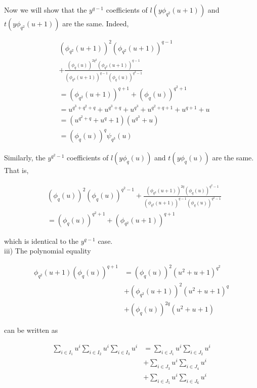 \documentclass[10pt]{article}
\begin{document}
Now we will show that the $y^{q-1}$ coefficients of $l\left(y \phi_{q^{2}}(u+1)\right)$ and $t\left(y \phi_{q^{2}}(u+1)\right)$ are the same. Indeed,

$$
\begin{aligned}
& \left(\phi_{q^{2}}(u+1)\right)^{2}\left(\phi_{q^{2}}(u+1)\right)^{q-1} \\
& +\frac{\left(\phi_{q}(u)\right)^{2 q^{2}}\left(\phi_{q^{2}}(u+1)\right)^{q-1}}{\left(\phi_{q^{2}}(u+1)\right)^{q-1}\left(\phi_{q}(u)\right)^{q^{2}-1}} \\
& =\left(\phi_{q^{2}}(u+1)\right)^{q+1}+\left(\phi_{q}(u)\right)^{q^{2}+1} \\
& =u^{q^{3}+q^{2}+q}+u^{q^{3}+q}+u^{q^{3}}+u^{q^{2}+q+1}+u^{q+1}+u \\
& =\left(u^{q^{2}+q}+u^{q}+1\right)\left(u^{q^{3}}+u\right) \\
& =\left(\phi_{q}(u)\right)^{q} \psi_{q^{3}}(u)
\end{aligned}
$$

Similarly, the $y^{q^{2}-1}$ coefficients of $l\left(y \phi_{q}(u)\right)$ and $t\left(y \phi_{q}(u)\right)$ are the same. That is,

$$
\begin{aligned}
& \left(\phi_{q}(u)\right)^{2}\left(\phi_{q}(u)\right)^{q^{2}-1}+\frac{\left(\phi_{q^{2}}(u+1)\right)^{2 q}\left(\phi_{q}(u)\right)^{q^{2}-1}}{\left(\phi_{q^{2}}(u+1)\right)^{q-1}\left(\phi_{q}(u)\right)^{q^{2}-1}} \\
& =\left(\phi_{q}(u)\right)^{q^{2}+1}+\left(\phi_{q^{2}}(u+1)\right)^{q+1}
\end{aligned}
$$

which is identical to the $y^{q-1}$ case.\\
iii) The polynomial equality

$$
\begin{aligned}
\phi_{q^{2}}(u+1)\left(\phi_{q}(u)\right)^{q+1} & =\left(\phi_{q}(u)\right)^{2}\left(u^{2}+u+1\right)^{q^{2}} \\
& +\left(\phi_{q^{2}}(u+1)\right)^{2}\left(u^{2}+u+1\right)^{q} \\
& +\left(\phi_{q}(u)\right)^{2 q}\left(u^{2}+u+1\right)
\end{aligned}
$$

can be written as

$$
\begin{aligned}
\sum_{i \in I_{1}} u^{i} \sum_{i \in I_{2}} u^{i} \sum_{i \in I_{3}} u^{i} & =\sum_{i \in J_{1}} u^{i} \sum_{i \in J_{2}} u^{i} \\
& +\sum_{i \in J_{3}} u^{i} \sum_{i \in J_{4}} u^{i} \\
& +\sum_{i \in J_{5}} u^{i} \sum_{i \in J_{6}} u^{i}
\end{aligned}
$$
\end{document}

